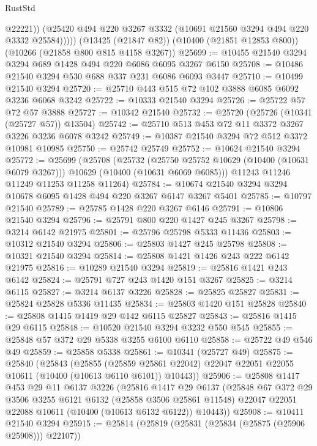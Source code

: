 \begin{lexlean}{RustStd}
\begin{coremodule}
{\begin{coremodule}
{{{{{{{{{{{{{{{{{{{{{{{{{              @22221))
          (@25420 @494 @220 @3267 @3332 (@10691 @21560 @3294 @494 @220 @3332 @25584)))))
    (@13425 (@21847 @82))
    (@10400 (@21851 @12853 @800))
    (@10266 (@21858 @800 @815 @4158 @3267))
@25699 := @10455 @21540 @3294 @3294 @689 @1428 @494 @220 @6086 @6095 @3267 @6150
@25708 := @10486 @21540 @3294 @530 @688 @337 @231 @6086 @6093 @3447
@25710 := @10499 @21540 @3294
@25720 := @25710 @443 @515 @72 @102 @3888 @6085 @6092 @3236 @6068 @3242
@25722 := @10333 @21540 @3294
@25726 := @25722 @57 @72 @57 @3888
@25727 := @10342 @21540
@25732 := @25720 (@25726 (@10341 (@25727 @57)) @13504)
@25742 := @25710 @513 @453 @72 @11 @3372 @3267 @3226 @3236 @6078 @3242
@25749 := @10387 @21540 @3294 @72 @512 @3372 @10981 @10985
@25750 := @25742 @25749
@25752 := @10624 @21540 @3294
@25772 := @25699
    (@25708
      (@25732
        (@25750 @25752 @10629 (@10400 (@10631 @6079 @3267)))
        @10629
        (@10400 (@10631 @6069 @6085)))
      @11243
      @11246
      @11249
      @11253
      @11258
      @11264)
@25784 := @10674 @21540 @3294 @3294 @10678 @6095 @1428 @494 @220 @3267 @6147 @3267 @5401
@25785 := @10797 @21540
@25789 := @25785 @1428 @220 @3267 @6146
@25791 := @10806 @21540 @3294
@25796 := @25791 @800 @220 @1427 @245 @3267
@25798 := @3214 @6142 @21975
@25801 := @25796 @25798 @5333 @11436
@25803 := @10312 @21540 @3294
@25806 := @25803 @1427 @245 @25798
@25808 := @10321 @21540 @3294
@25814 := @25808 @1421 @1426 @243 @222 @6142 @21975
@25816 := @10289 @21540 @3294
@25819 := @25816 @1421 @243 @6142
@25824 := @25791 @727 @243 @1420 @151 @3267
@25825 := @3214 @6115
@25827 := @3214 @6137 @3226
@25828 := @25825 @25827
@25831 := @25824 @25828 @5336 @11435
@25834 := @25803 @1420 @151 @25828
@25840 := @25808 @1415 @1419 @29 @142 @6115 @25827
@25843 := @25816 @1415 @29 @6115
@25848 := @10520 @21540 @3294 @3232 @550 @545
@25855 := @25848 @57 @372 @29 @5338 @3255 @6100 @6110
@25858 := @25722 @49 @546 @49
@25859 := @25858 @5338
@25861 := @10341 (@25727 @49)
@25875 := @25840
    (@25843
      (@25855
        (@25859 @25861 @22042)
        @22047
        @22051
        @22055
        @10611
        (@10400 (@10613 @6110 @6101))
        @10443))
@25906 := @25808
    @1417
    @453
    @29
    @11
    @6137
    @3226
    (@25816
      @1417
      @29
      @6137
      (@25848
        @67
        @372
        @29
        @3506
        @3255
        @6121
        @6132
        (@25858 @3506 @25861 @11548)
        @22047
        @22051
        @22088
        @10611
        (@10400 (@10613 @6132 @6122))
        @10443))
@25908 := @10411 @21540 @3294
@25915 := @25814 (@25819 (@25831 (@25834 (@25875 (@25906 @25908))) @22107))
}}}}}}}}}}}}}}}}}}}}}}}}}
\end{coremodule}}
\end{coremodule}
\end{lexlean}
